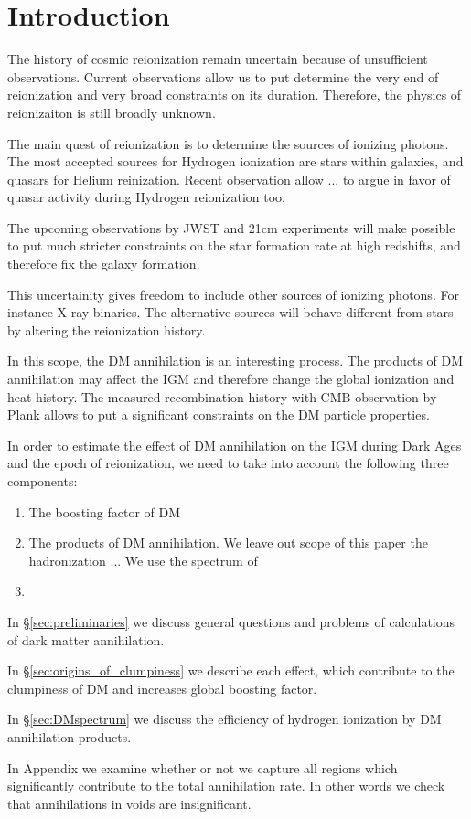 \section{Introduction}

The history of cosmic reionization remain uncertain because of unsufficient observations. Current observations allow us to put determine the very end of reionization and very broad constraints on its duration. Therefore, the physics of reionizaiton is still broadly unknown.

The main quest of reionization is to determine the sources of ionizing photons. The most accepted sources for Hydrogen ionization are stars within galaxies, and quasars for Helium reinization. Recent observation allow ... to argue in favor of quasar activity during Hydrogen reionization too.

The upcoming observations by JWST and 21cm experiments will make possible to put much stricter constraints on the star formation rate at high redshifts, and therefore fix the galaxy formation.

This uncertainity gives freedom to include other sources of ionizing photons. For instance X-ray binaries. The alternative sources will behave different from stars by altering the reionization history. 

In this scope, the DM annihilation is an interesting process. The products of DM annihilation may affect the IGM and therefore change the global ionization and heat history. The measured recombination history with CMB observation by Plank allows to put a significant constraints on the DM particle properties.

In order to estimate the effect of DM annihilation on the IGM during Dark Ages and the epoch of reionization, we need to take into account the following three components:
\begin{enumerate}
\item The boosting factor of DM  
\item The products of DM annihilation. We leave out scope of this paper the hadronization ... We use the spectrum of 
\item
\end{enumerate}
In \S\ref{sec:preliminaries} we discuss general questions and problems of calculations of dark matter annihilation.

In \S\ref{sec:origins_of_clumpiness} we describe each effect, which contribute to the clumpiness of DM and increases global boosting factor.

In \S\ref{sec:DMspectrum} we discuss the efficiency of hydrogen ionization by DM annihilation products.

In Appendix we examine whether or not we capture all regions which significantly contribute to the total annihilation rate. In other words we check that annihilations in voids are insignificant.
